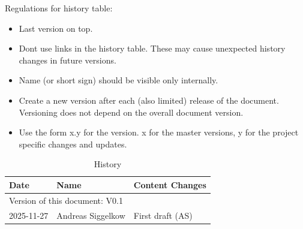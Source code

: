 Regulations for history table:
\begin{itemize}
  \item Last version on top.
  \item Dont use links in the history table. These may cause unexpected history changes in future versions.
  \item Name (or short sign) should be visible only internally.
  \item Create a new version after each (also limited) release of the document. Versioning does not depend on the overall document version.
  \item Use the form x.y for the version. x for the master versions, y for the project specific changes and updates.
\end{itemize}

\begin{table}[H]
\caption{History}
\label{tab:imemhistory01a}
\centering
\begin{tabularx}{\textwidth}{|X |X |X |}
  \hline
  Date & Name & Content Changes \\
  \hline
  \multicolumn{3}{|l|}{Version of this document: V0.1} \\
  \hline
  2025-11-27 & Andreas Siggelkow & First draft (AS) \\
  \hline
\end{tabularx}
\end{table}
